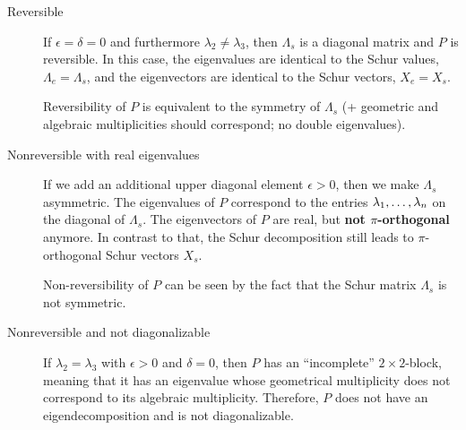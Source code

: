 



\begin{description}
	\item [Reversible] If $\epsilon = \delta = 0$ and furthermore $\lambda_2 \neq \lambda_3$, then $\Lambda_s$ is a diagonal matrix and $P$ is reversible.
	In this case, the eigenvalues are identical to the Schur values, $\Lambda_e = \Lambda_s$, and the eigenvectors are identical to the Schur vectors, $X_e = X_s$.
	
	
	Reversibility of $P$ is equivalent to the symmetry of $\Lambda_s$ (+ geometric and algebraic multiplicities should correspond; no double eigenvalues).
	\item [Nonreversible with real eigenvalues] If we add an additional upper diagonal element $\epsilon > 0$, then we make $\Lambda_s$ asymmetric.
	The eigenvalues of $P$ correspond to the entries $\lambda_1,\dots,\lambda_n$ on the diagonal of $\Lambda_s$.
	The eigenvectors of $P$ are real, but \textbf{not $\pi$-orthogonal} anymore. In contrast to that, the Schur decomposition still leads to $\pi$-orthogonal Schur vectors $X_s$.
	
	Non-reversibility of $P$ can be seen by the fact that the Schur matrix $\Lambda_s$ is not symmetric. 
	
	
	
	\item[Nonreversible and not diagonalizable] If $\lambda_2 = \lambda_3$ with $\epsilon > 0$ and $\delta = 0$, then $P$ has an ``incomplete'' $2 \times 2$-block, meaning that it has an eigenvalue whose geometrical multiplicity does not correspond to its algebraic multiplicity.
	Therefore, $P$ does not have an eigendecomposition and is not diagonalizable. 
	

\end{description}
